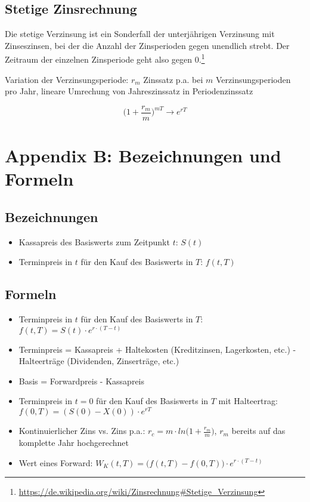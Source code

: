 \subsection{Stetige Zinsrechnung}

Die stetige Verzinsung ist ein Sonderfall der unterjährigen Verzinsung mit Zinseszinsen, bei der die Anzahl der Zinsperioden gegen unendlich strebt. Der Zeitraum der einzelnen Zinsperiode geht also gegen \(0\).\footnote{\url{https://de.wikipedia.org/wiki/Zinsrechnung\#Stetige_Verzinsung}}

Variation der Verzinsungsperiode: \(r_m\) Zinssatz p.a. bei \(m\) Verzinsungsperioden pro Jahr, lineare Umrechung von Jahreszinssatz in Periodenzinssatz

\[\Big(1+\frac{r_m}{m}\Big)^{mT} \longrightarrow e^{rT}\]


\section{Appendix B: Bezeichnungen und Formeln}

\subsection{Bezeichnungen}
\begin{itemize}
	\item Kassapreis des Basiswerts zum Zeitpunkt \(t\): \(S(t)\)
	\item Terminpreis in \(t\) für den Kauf des Basiswerts in \(T\): \(f(t,T)\)
\end{itemize}


\subsection{Formeln}
\begin{itemize}
	\item Terminpreis in \(t\) für den Kauf des Basiswerts in \(T\): \(f(t,T) = S(t)\cdot e^{r\cdot (T-t)}\)
	\item Terminpreis = Kassapreis + Haltekosten (Kreditzinsen, Lagerkosten, etc.) - Halteerträge (Dividenden, Zinserträge, etc.)
	\item Basis = Forwardpreis - Kassapreis
	\item Terminpreis in \(t=0\) für den Kauf des Basiswerts in \(T\) mit Halteertrag: \(f(0,T) = (S(0)-X(0))\cdot e^{rT}\)
	\item Kontinuierlicher Zins vs. Zins p.a.: \(r_c = m \cdot ln\Big(1+\frac{r_m}{m}\Big)\), \(r_m\) bereits auf das komplette Jahr hochgerechnet
	\item Wert eines Forward: \(W_K(t,T) = \Big(f(t,T)-f(0,T)\Big) \cdot e^{r\cdot (T-t)}\)
\end{itemize}
